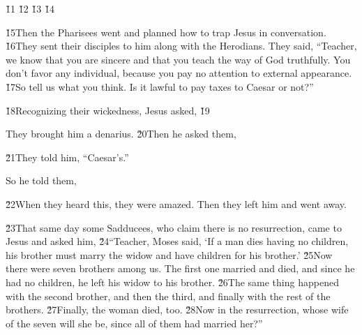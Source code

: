 \v{11} \v{12} \v{13} \v{14}

\v{15}Then the Pharisees went and planned how to trap Jesus in conversation. \v{16}They sent their disciples to him along with the Herodians. They said, ``Teacher, we know that you are sincere and that you teach the way of God truthfully. You don't favor any individual, because you pay no attention to external appearance. \v{17}So tell us what you think. Is it lawful to pay taxes to Caesar or not?''

\v{18}Recognizing their wickedness, Jesus asked,  \v{19}

They brought him a denarius. \v{20}Then he asked them, 

\v{21}They told him, ``Caesar's.''

So he told them, 

\v{22}When they heard this, they were amazed. Then they left him and went away.

\v{23}That same day some Sadducees, who claim there is no resurrection, came to Jesus and asked him, \v{24}``Teacher, Moses said, `If a man dies having no children, his brother must marry the widow and have children for his brother.' \v{25}Now there were seven brothers among us. The first one married and died, and since he had no children, he left his widow to his brother. \v{26}The same thing happened with the second brother, and then the third, and finally with the rest of the brothers. \v{27}Finally, the woman died, too. \v{28}Now in the resurrection, whose wife of the seven will she be, since all of them had married her?''

